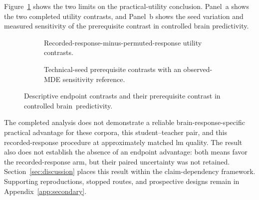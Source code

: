 Figure~\ref{fig:bounded-practical-utility} shows the two limits on the practical-utility conclusion.
Panel~a shows the two completed utility contrasts, and Panel~b shows the seed variation and measured sensitivity of the prerequisite contrast in controlled brain predictivity.

\begin{figure}[H]
  \centering
  \begin{subfigure}[t]{\textwidth}
    \centering
    \resizebox{\linewidth}{!}{}
    \par\vspace{0.35em}
    \caption{Recorded-response-minus-permuted-response utility contrasts.}
  \end{subfigure}
  \par\smallskip
  \begin{subfigure}[t]{\textwidth}
    \centering
    \resizebox{\linewidth}{!}{}
    \par\vspace{0.35em}
    \caption{Technical-seed prerequisite contrasts with an observed-MDE sensitivity reference.}
  \end{subfigure}
  \caption{Descriptive endpoint contrasts and their prerequisite contrast in controlled brain~\mbox{predictivity}.}
  \label{fig:bounded-practical-utility}
\end{figure}
\FloatBarrier

The completed analysis does not demonstrate a reliable brain-response-specific practical advantage for these corpora, this student--teacher pair, and this recorded-response procedure at approximately matched \ac{lm} quality.
The result also does not establish the absence of an endpoint advantage: both means favor the recorded-response arm, but their paired uncertainty was not retained.
Section~\ref{sec:discussion} places this result within the claim-dependency framework.
Supporting reproductions, stopped routes, and prospective designs remain in Appendix~\ref{app:secondary}.
